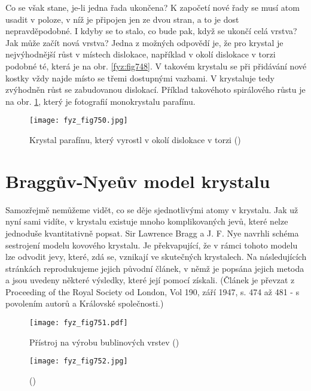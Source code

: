     Co se však stane, je-li jedna řada ukončena? K započetí nové řady se musí atom usadit v poloze, 
    v níž je připojen jen ze dvou stran, a to je dost nepravděpodobné. I kdyby se to stalo, co bude 
    pak, když se ukončí celá vrstva? Jak může začít nová vrstva? Jedna z možných odpovědí je, že 
    pro krystal je nejvýhodnější růst v místech dislokace, například v okolí dislokace v torzi 
    podobné té, která je na obr. \ref{fyz:fig748}. V takovém krystalu se při přidávání nové kostky 
    vždy najde místo se třemi dostupnými vazbami. V krystaluje tedy zvýhodněn růst se zabudovanou 
    dislokací. Příklad takovéhoto spirálového růstu je na obr. \ref{fyz:fig750}, který je 
    fotografií monokrystalu parafínu.
    
    \begin{figure}[ht!] %
      \centering
      \texttt{[image: fyz\_fig750.jpg]}
      \caption{Krystal parafínu, který vyrostl v okolí dislokace v torzi
               (\cite[s.~555]{Feynman02})}
      \label{fyz:fig750}
    \end{figure}

  \section{Braggův-Nyeův model krystalu}\label{fyz:IIchapXXXsecIX}
    Samozřejmě nemůžeme vidět, co se děje sjednotlivými atomy v krystalu. Jak už nyní sami vidíte, 
    v krystalu existuje mnoho komplikovaných jevů, které nelze jednoduše kvantitativně popsat. Sir 
    Lawrence Bragg a J. F. Nye navrhli schéma sestrojení modelu kovového krystalu. Je překvapující, 
    že v rámci tohoto modelu lze odvodit jevy, které, zdá se, vznikají ve skutečných krystalech. Na 
    následujících stránkách reprodukujeme jejich původní článek, v němž je popsána jejich metoda a 
    jsou uvedeny některé výsledky, které její pomocí získali. (Článek je převzat z Proceeding of 
    the Royal Society od London, Vol 190, září 1947, s. 474 až 481 - s povolením autorů a Královské 
    společnosti.)

    \begin{figure}[ht!] %
      \centering
      \texttt{[image: fyz\_fig751.pdf]}
      \caption{Přístroj na výrobu bublinových vrstev
               (\cite[s.~557]{Feynman02})}
      \label{fyz:fig751}
    \end{figure}

    \begin{figure}[ht!] %
      \centering
      \texttt{[image: fyz\_fig752.jpg]}
      \caption{
               (\cite[s.~707]{Feynman02})}
      \label{fyz:fig752}
    \end{figure}

